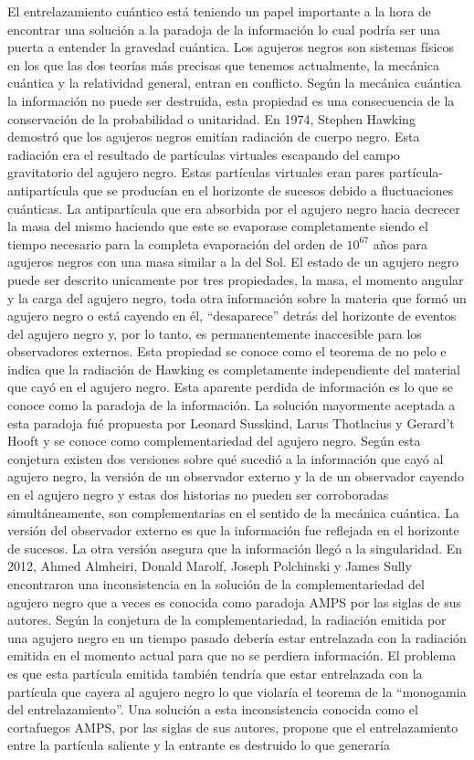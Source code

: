 \documentclass{article}
\theoremstyle{plain}
\theoremstyle{definition}
\begin{document}
	El entrelazamiento cuántico está teniendo un papel importante a la hora de encontrar una solución a la paradoja de la información lo cual podría ser una puerta a entender la gravedad cuántica. Los agujeros negros son sistemas físicos en los que las dos teorías más precisas que tenemos actualmente, la mecánica cuántica y la relatividad general, entran en conflicto. Según la mecánica cuántica la información no puede ser destruida, esta propiedad es una consecuencia de la conservación de la probabilidad o unitaridad. En 1974, Stephen Hawking demostró que los agujeros negros emitían radiación de cuerpo negro. Esta radiación era el resultado de partículas virtuales escapando del campo gravitatorio del agujero negro. Estas partículas virtuales eran pares partícula-antipartícula que se producían en el horizonte de sucesos debido a fluctuaciones cuánticas. La antipartícula que era absorbida por el agujero negro hacia decrecer la masa del mismo haciendo que este se evaporase completamente siendo el tiempo necesario para la completa evaporación del orden de \(10^{67}\) años para agujeros negros con una masa similar a la del Sol. El estado de un agujero negro puede ser descrito unicamente por tres propiedades, la masa, el momento angular y la carga del agujero negro, toda otra información  sobre la materia que formó un agujero negro o está cayendo en él, ``desaparece'' detrás del horizonte de eventos del agujero negro y, por lo tanto, es permanentemente inaccesible para los observadores externos. Esta propiedad se conoce como el teorema de no pelo e indica que la radiación de Hawking es completamente independiente del material que cayó en el agujero negro. Esta aparente perdida de información es lo que se conoce como la paradoja de la información. La solución mayormente aceptada a esta paradoja fué propuesta por Leonard Susskind, Larus Thotlacius y Gerard't Hooft \cite{Susskind_1993}\cite{tHooft:1984kcu} y se conoce como complementariedad del agujero negro. Según esta conjetura existen dos versiones sobre qué sucedió a la información que cayó al agujero negro, la versión de un observador externo y la de un observador cayendo en el agujero negro y estas dos historias no pueden ser corroboradas simultáneamente, son complementarias en el sentido de la mecánica cuántica. La versión del observador externo es que la información fue reflejada en el horizonte de sucesos. La otra versión asegura que la información llegó a la singularidad. En 2012, Ahmed Almheiri, Donald Marolf, Joseph Polchinski y James Sully encontraron una inconsistencia en la solución de la complementariedad del agujero negro que a veces es conocida como paradoja AMPS por las siglas de sus autores. Según la conjetura de la complementariedad, la radiación emitida por una agujero negro en un tiempo pasado debería estar entrelazada con la radiación emitida en el momento actual para que no se perdiera información. El problema es que esta partícula emitida también tendría que estar entrelazada con la partícula que cayera al agujero negro lo que violaría el teorema de la ``monogamia del entrelazamiento''. Una solución a esta inconsistencia conocida como el cortafuegos AMPS\cite{Almheiri:2012rt}, por las siglas de sus autores, propone que el entrelazamiento entre la partícula saliente y la entrante es destruido lo que generaría 
\end{document}
